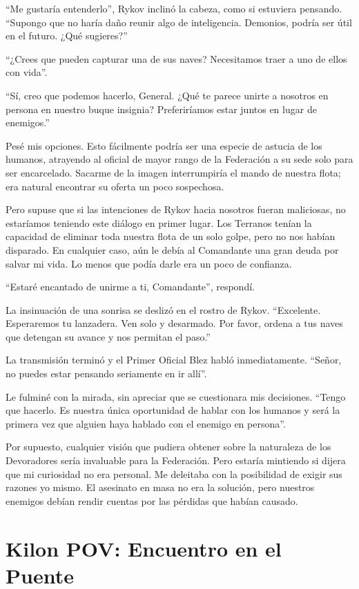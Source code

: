 \documentclass[spanish,12pt,a4paper,oneside,titlepage]{book}
\begin{document}
    “Me gustaría entenderlo”, Rykov inclinó la cabeza, como si estuviera pensando. “Supongo que no haría daño reunir algo de inteligencia. Demonios, podría ser útil en el futuro. ¿Qué sugieres?”

    “¿Crees que pueden capturar una de sus naves? Necesitamos traer a uno de ellos con vida”.

    ``Sí, creo que podemos hacerlo, General. ¿Qué te parece unirte a nosotros en persona en nuestro buque insignia? Preferiríamos estar juntos en lugar de enemigos.''

    Pesé mis opciones. Esto fácilmente podría ser una especie de astucia de los humanos, atrayendo al oficial de mayor rango de la Federación a su sede solo para ser encarcelado. Sacarme de la imagen interrumpiría el mando de nuestra flota; era natural encontrar su oferta un poco sospechosa.

    Pero supuse que si las intenciones de Rykov hacia nosotros fueran maliciosas, no estaríamos teniendo este diálogo en primer lugar. Los Terranos tenían la capacidad de eliminar toda nuestra flota de un solo golpe, pero no nos habían disparado. En cualquier caso, aún le debía al Comandante una gran deuda por salvar mi vida. Lo menos que podía darle era un poco de confianza.

    “Estaré encantado de unirme a ti, Comandante”, respondí.

    La insinuación de una sonrisa se deslizó en el rostro de Rykov. “Excelente. Esperaremos tu lanzadera. Ven solo y desarmado. Por favor, ordena a tus naves que detengan su avance y nos permitan el paso.”

    La transmisión terminó y el Primer Oficial Blez habló inmediatamente. “Señor, no puedes estar pensando seriamente en ir allí”.

    Le fulminé con la mirada, sin apreciar que se cuestionara mis decisiones. “Tengo que hacerlo. Es nuestra única oportunidad de hablar con los humanos y será la primera vez que alguien haya hablado con el enemigo en persona”.

    Por supuesto, cualquier visión que pudiera obtener sobre la naturaleza de los Devoradores sería invaluable para la Federación. Pero estaría mintiendo si dijera que mi curiosidad no era personal. Me deleitaba con la posibilidad de exigir sus razones yo mismo. El asesinato en masa no era la solución, pero nuestros enemigos debían rendir cuentas por las pérdidas que habían causado.

    \chapter{Kilon POV: Encuentro en el Puente}
\end{document}

